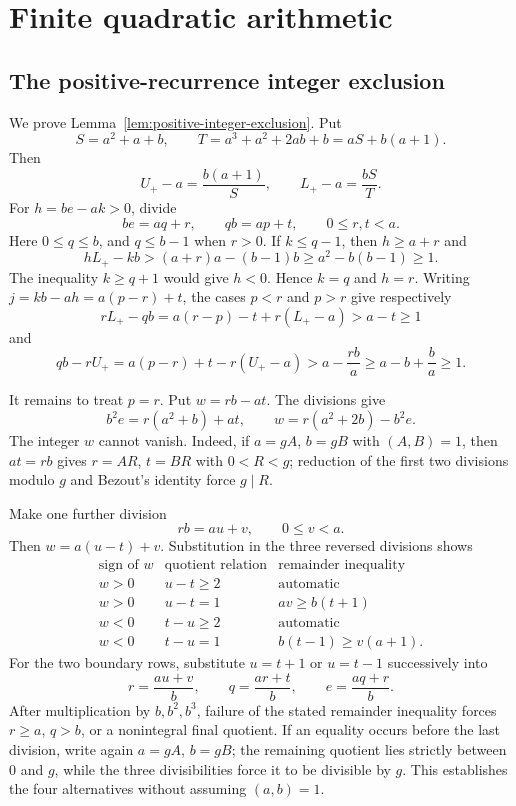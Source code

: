 \section{Finite quadratic arithmetic}
\label{app:quadratic-arithmetic}

\subsection{The positive-recurrence integer exclusion}
\label{app:positive-integer-exclusion}

We prove Lemma~\ref{lem:positive-integer-exclusion}.  Put
\[
S=a^2+a+b,\qquad T=a^3+a^2+2ab+b=aS+b(a+1).
\]
Then
\[
U_+-a=\frac{b(a+1)}S,\qquad L_+-a=\frac{bS}T.
\]
For $h=be-ak>0$, divide
\[
be=aq+r,\qquad qb=ap+t,\qquad 0\le r,t<a.
\]
Here $0\le q\le b$, and $q\le b-1$ when $r>0$.  If $k\le q-1$, then
$h\ge a+r$ and
\[
hL_+-kb>(a+r)a-(b-1)b\ge a^2-b(b-1)\ge1.
\]
The inequality $k\ge q+1$ would give $h<0$.  Hence $k=q$ and $h=r$.
Writing $j=kb-ah=a(p-r)+t$, the cases $p<r$ and $p>r$ give respectively
\[
rL_+-qb=a(r-p)-t+r(L_+-a)>a-t\ge1
\]
and
\[
qb-rU_+=a(p-r)+t-r(U_+-a)
>a-\frac{rb}{a}\ge a-b+\frac ba\ge1.
\]

It remains to treat $p=r$.  Put $w=rb-at$.  The divisions give
\begin{equation}
b^2e=r(a^2+b)+at,\qquad w=r(a^2+2b)-b^2e.
\label{eq:app-terminal-divisions}
\end{equation}
The integer $w$ cannot vanish.  Indeed, if $a=gA$, $b=gB$ with
$(A,B)=1$, then $at=rb$ gives $r=AR$, $t=BR$ with $0<R<g$; reduction of
the first two divisions modulo $g$ and Bezout's identity force $g\mid R$.

Make one further division
\[
rb=au+v,\qquad 0\le v<a.
\]
Then $w=a(u-t)+v$.  Substitution in the three reversed divisions shows
\[
\begin{array}{c|c|c}
\text{sign of }w&\text{quotient relation}&\text{remainder inequality}\\ \hline
w>0&u-t\ge2&\text{automatic}\\
w>0&u-t=1&av\ge b(t+1)\\
w<0&t-u\ge2&\text{automatic}\\
w<0&t-u=1&b(t-1)\ge v(a+1).
\end{array}
\]
For the two boundary rows, substitute $u=t+1$ or $u=t-1$ successively into
\[
r=\frac{au+v}{b},\qquad q=\frac{ar+t}{b},\qquad
e=\frac{aq+r}{b}.
\]
After multiplication by $b,b^2,b^3$, failure of the stated remainder
inequality forces $r\ge a$, $q>b$, or a nonintegral final quotient.  If an
equality occurs before the last division, write again $a=gA$, $b=gB$; the
remaining quotient lies strictly between $0$ and $g$, while the three
divisibilities force it to be divisible by $g$.  This establishes the four
alternatives without assuming $(a,b)=1$.


